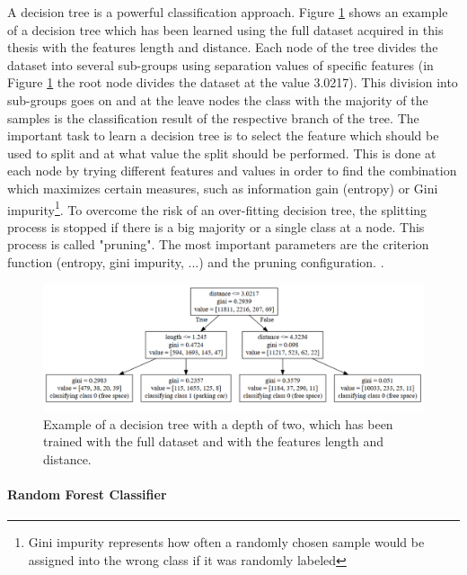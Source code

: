 A decision tree is a powerful classification approach. Figure \ref{fig:decision_tree} shows an example of a decision tree which has been learned using the full dataset acquired in this thesis with the features length and distance. Each node of the tree divides the dataset into several sub-groups using separation values of specific features (in Figure \ref{fig:decision_tree} the root node divides the dataset at the value 3.0217). This division into sub-groups goes on and at the leave nodes the class with the majority of the samples is the classification result of the respective branch of the tree. The important task to learn a decision tree is to select the feature which should be used to split and at what value the split should be performed. This is done at each node by trying different features and values in order to find the combination which maximizes certain measures, such as information gain (entropy) or Gini impurity\footnote{Gini impurity represents how often a randomly chosen sample would be assigned into the wrong class if it was randomly labeled}. To overcome the risk of an over-fitting decision tree, the splitting process is stopped if there is a big majority or a single class at a node. This process is called "pruning". The most important parameters are the criterion function (entropy, gini impurity, ...) and the pruning configuration. \cite{Hall2016_DataMining_ML}.

\begin{figure}
	\centering
	\includegraphics[width=\textwidth]{img/decision_tree2.PNG}

	\caption{Example of a decision tree with a depth of two, which has been trained with the full dataset and with the features length and distance.}
	\label{fig:decision_tree}
\end{figure}





\paragraph{Random Forest Classifier}

